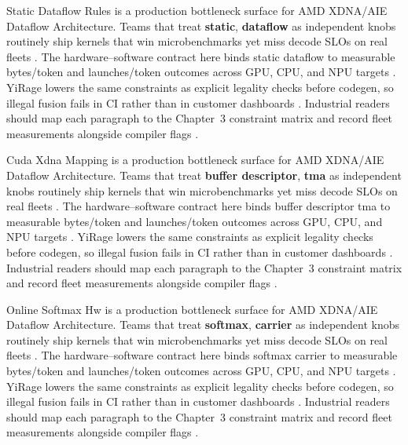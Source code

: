 Static Dataflow Rules is a production bottleneck surface for AMD XDNA/AIE Dataflow Architecture. Teams that treat \textbf{static}, \textbf{dataflow} as independent knobs routinely ship kernels that win microbenchmarks yet miss decode SLOs on real fleets \citep{memoryfloor2026,amd2024xdna}. The hardware--software contract here binds static dataflow to measurable bytes/token and launches/token outcomes across GPU, CPU, and NPU targets \citep{nvidia2022hopper,amd2024aie}. YiRage lowers the same constraints as explicit legality checks before codegen, so illegal fusion fails in CI rather than in customer dashboards \citep{semianalysis2024tma,dlbook}. Industrial readers should map each paragraph to the Chapter~3 constraint matrix and record fleet measurements alongside compiler flags \citep{amd2024xdna,dao2022flashattention}.

Cuda Xdna Mapping is a production bottleneck surface for AMD XDNA/AIE Dataflow Architecture. Teams that treat \textbf{buffer descriptor}, \textbf{tma} as independent knobs routinely ship kernels that win microbenchmarks yet miss decode SLOs on real fleets \citep{nvidia2022hopper,amd2024aie}. The hardware--software contract here binds buffer descriptor tma to measurable bytes/token and launches/token outcomes across GPU, CPU, and NPU targets \citep{semianalysis2024tma,dlbook}. YiRage lowers the same constraints as explicit legality checks before codegen, so illegal fusion fails in CI rather than in customer dashboards \citep{amd2024xdna,dao2022flashattention}. Industrial readers should map each paragraph to the Chapter~3 constraint matrix and record fleet measurements alongside compiler flags \citep{amd2024aie,kwon2023vllm}.

Online Softmax Hw is a production bottleneck surface for AMD XDNA/AIE Dataflow Architecture. Teams that treat \textbf{softmax}, \textbf{carrier} as independent knobs routinely ship kernels that win microbenchmarks yet miss decode SLOs on real fleets \citep{semianalysis2024tma,dlbook}. The hardware--software contract here binds softmax carrier to measurable bytes/token and launches/token outcomes across GPU, CPU, and NPU targets \citep{amd2024xdna,dao2022flashattention}. YiRage lowers the same constraints as explicit legality checks before codegen, so illegal fusion fails in CI rather than in customer dashboards \citep{amd2024aie,kwon2023vllm}. Industrial readers should map each paragraph to the Chapter~3 constraint matrix and record fleet measurements alongside compiler flags \citep{dlbook,nvidia2024cudagraphs}.

